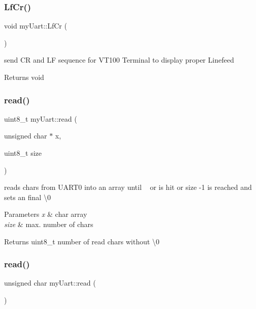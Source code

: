 \subsubsection{\texorpdfstring{Lf\+Cr()}{LfCr()}}
{\footnotesize\ttfamily void my\+Uart\+::\+Lf\+Cr (\begin{DoxyParamCaption}{ }\end{DoxyParamCaption})}



send CR and LF sequence for V\+T100 Terminal to display proper Linefeed 

\begin{DoxyReturn}{Returns}
void 
\end{DoxyReturn}
\mbox{\label{classmy_uart_a29fd0034f6c7cd8612614dd85cc6f48d}} 
\subsubsection{\texorpdfstring{read()}{read()}\hspace{0.1cm}{\footnotesize\ttfamily [1/2]}}
{\footnotesize\ttfamily uint8\+\_\+t my\+Uart\+::read (\begin{DoxyParamCaption}\item[{unsigned char $\ast$}]{x,  }\item[{uint8\+\_\+t}]{size }\end{DoxyParamCaption})}



reads chars from U\+A\+R\+T0 into an array until ~\newline
 or  is hit or size -\/1 is reached and sets an final \textbackslash{}0 


\begin{DoxyParams}{Parameters}
{\em x} & char array \\
\hline
{\em size} & max. number of chars\\
\hline
\end{DoxyParams}
\begin{DoxyReturn}{Returns}
uint8\+\_\+t number of read chars without \textbackslash{}0 
\end{DoxyReturn}
\mbox{\label{classmy_uart_a65ccd1b10b9b11617a39890265052338}} 
\subsubsection{\texorpdfstring{read()}{read()}\hspace{0.1cm}{\footnotesize\ttfamily [2/2]}}
{\footnotesize\ttfamily unsigned char my\+Uart\+::read (\begin{DoxyParamCaption}{ }\end{DoxyParamCaption})}



